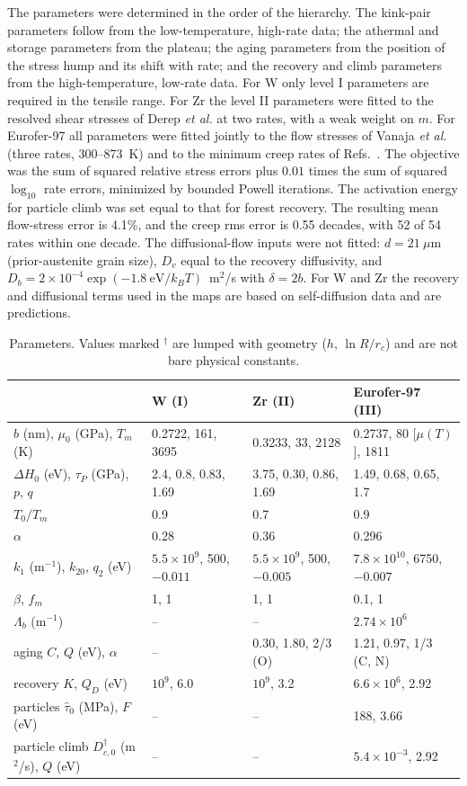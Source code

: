 \documentclass[aps,prl,onecolumn,superscriptaddress,amsmath,amssymb,floatfix]{revtex4-2}
\newcommand{\kT}{k_BT}
\begin{document}
The parameters were determined in the order of the hierarchy. The kink-pair parameters follow from the low-temperature, high-rate data; the athermal and storage parameters from the plateau; the aging parameters from the position of the stress hump and its shift with rate; and the recovery and climb parameters from the high-temperature, low-rate data. For W only level I parameters are required in the tensile range. For Zr the level II parameters were fitted to the resolved shear stresses of Derep \emph{et al.} at two rates, with a weak weight on $m$. For Eurofer-97 all parameters were fitted jointly to the flow stresses of Vanaja \emph{et al.} (three rates, 300--873~K) and to the minimum creep rates of Refs.~\cite{S_Fern,S_Yu}. The objective was the sum of squared relative stress errors plus $0.01$ times the sum of squared $\log_{10}$ rate errors, minimized by bounded Powell iterations. The activation energy for particle climb was set equal to that for forest recovery. The resulting mean flow-stress error is 4.1\%, and the creep rms error is 0.55 decades, with 52 of 54 rates within one decade. The diffusional-flow inputs were not fitted: $d=21~\mu$m (prior-austenite grain size), $D_v$ equal to the recovery diffusivity, and $D_b=2\times10^{-4}\exp(-1.8~\mathrm{eV}/\kT)$~m$^2$/s with $\delta=2b$. For W and Zr the recovery and diffusional terms used in the maps are based on self-diffusion data and are predictions.

\begin{table}[h]
\caption{Parameters. Values marked $^\dagger$ are lumped with geometry ($h$, $\ln R/r_c$) and are not bare physical constants.}
\begin{ruledtabular}
\begin{tabular}{llll}
 & W (I) & Zr (II) & Eurofer-97 (III)\\
\hline
$b$ (nm), $\mu_0$ (GPa), $T_m$ (K) & 0.2722, 161, 3695 & 0.3233, 33, 2128 & 0.2737, 80 [$\mu(T)$], 1811\\
$\Delta H_0$ (eV), $\tau_P$ (GPa), $p$, $q$ & 2.4, 0.8, 0.83, 1.69 & 3.75, 0.30, 0.86, 1.69 & 1.49, 0.68, 0.65, 1.7\\
$T_0/T_m$ & 0.9 & 0.7 & 0.9\\
$\alpha$ & 0.28 & 0.36 & 0.296\\
$k_1$ (m$^{-1}$), $k_{20}$, $q_2$ (eV) & $5.5\times10^9$, 500, $-0.011$ & $5.5\times10^9$, 500, $-0.005$ & $7.8\times10^{10}$, 6750, $-0.007$\\
$\beta$, $f_m$ & 1, 1 & 1, 1 & 0.1, 1\\
$\Lambda_b$ (m$^{-1}$) & -- & -- & $2.74\times10^6$\\
aging $C$, $Q$ (eV), $\alpha$ & -- & 0.30, 1.80, 2/3 (O) & 1.21, 0.97, 1/3 (C, N)\\
recovery $K$, $Q_D$ (eV) & $10^9$, 6.0 & $10^9$, 3.2 & $6.6\times10^{6}$, 2.92\\
particles $\hat\tau_0$ (MPa), $F$ (eV) & -- & -- & 188, 3.66\\
particle climb $D_{c,0}^\dagger$ (m$^2$/s), $Q$ (eV) & -- & -- & $5.4\times10^{-3}$, 2.92\\
\end{tabular}
\end{ruledtabular}
\end{table}
\end{document}
